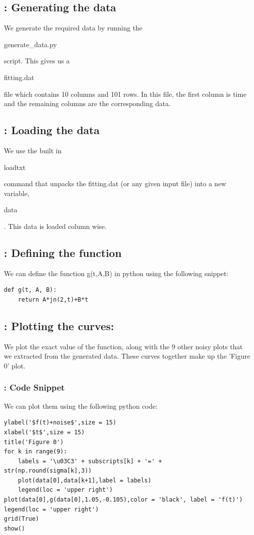 \documentclass[11pt]{article}
\begin{document}
\subsection{: Generating the data}
We generate the required data by running the \begin{textit}generate\_data.py\end{textit} script. This gives us a \begin{textit}fitting.dat\end{textit} file which contains 10 columns and 101 rows. In this file, the first column is time and the remaining columns are the corresponding data.

\subsection{: Loading the data}
We use the built in \begin{textbf}loadtxt\end{textbf} command that unpacks the fitting.dat (or any given input file) into a new variable, \begin{textbf}data\end{textbf}. This data is loaded column wise.

\subsection{: Defining the function}
We can define the function g(t,A,B) in python using the following snippet:
\begin{verbatim}
def g(t, A, B):
    return A*jn(2,t)+B*t
\end{verbatim}

\subsection{: Plotting the curves:}
We plot the exact value of the function, along with the 9 other noisy plots that we extracted from the generated data. These curves together make up the 'Figure 0' plot.
\subsubsection{: Code Snippet}
We can plot them using the following python code:
\begin{verbatim}
ylabel('$f(t)+noise$',size = 15)
xlabel('$t$',size = 15)
title('Figure 0')
for k in range(9):
	labels = '\u03C3' + subscripts[k] + '=' + str(np.round(sigma[k],3))
	plot(data[0],data[k+1],label = labels)
	legend(loc = 'upper right')
plot(data[0],g(data[0],1.05,-0.105),color = 'black', label = 'f(t)')
legend(loc = 'upper right')
grid(True)
show()
\end{verbatim}
\end{document}
